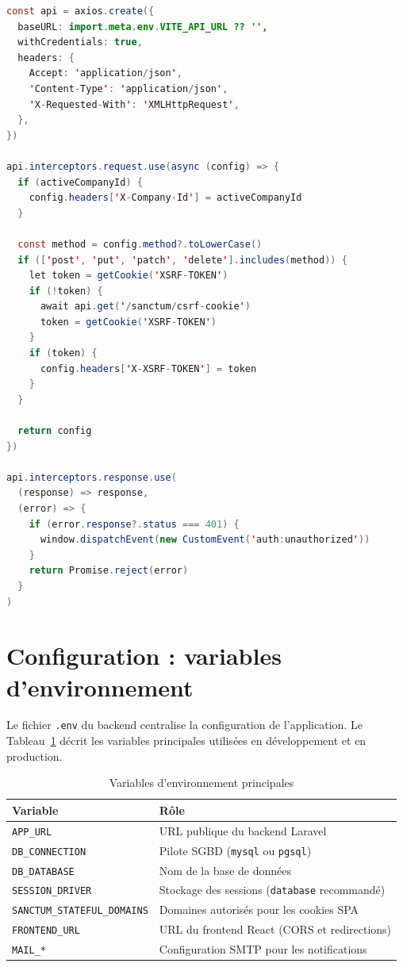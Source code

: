 \begin{lstlisting}[language=Java,
  caption={client.js : configuration Axios et intercepteurs (extrait)}]
const api = axios.create({
  baseURL: import.meta.env.VITE_API_URL ?? '',
  withCredentials: true,
  headers: {
    Accept: 'application/json',
    'Content-Type': 'application/json',
    'X-Requested-With': 'XMLHttpRequest',
  },
})

api.interceptors.request.use(async (config) => {
  if (activeCompanyId) {
    config.headers['X-Company-Id'] = activeCompanyId
  }

  const method = config.method?.toLowerCase()
  if (['post', 'put', 'patch', 'delete'].includes(method)) {
    let token = getCookie('XSRF-TOKEN')
    if (!token) {
      await api.get('/sanctum/csrf-cookie')
      token = getCookie('XSRF-TOKEN')
    }
    if (token) {
      config.headers['X-XSRF-TOKEN'] = token
    }
  }

  return config
})

api.interceptors.response.use(
  (response) => response,
  (error) => {
    if (error.response?.status === 401) {
      window.dispatchEvent(new CustomEvent('auth:unauthorized'))
    }
    return Promise.reject(error)
  }
)
\end{lstlisting}

\section{Configuration : variables d'environnement}

Le fichier \texttt{.env} du backend centralise la configuration de l'application.
Le Tableau~\ref{tab:annexe_env} décrit les variables principales utilisées en
développement et en production.

\begin{table}[H]
\caption{Variables d'environnement principales}
\label{tab:annexe_env}
\centering
\small
\begin{tabular}{|l|p{8.5cm}|}
\hline
\textbf{Variable} & \textbf{Rôle} \\
\hline
\texttt{APP\_URL} & URL publique du backend Laravel \\
\hline
\texttt{DB\_CONNECTION} & Pilote SGBD (\texttt{mysql} ou \texttt{pgsql}) \\
\hline
\texttt{DB\_DATABASE} & Nom de la base de données \\
\hline
\texttt{SESSION\_DRIVER} & Stockage des sessions (\texttt{database} recommandé) \\
\hline
\texttt{SANCTUM\_STATEFUL\_DOMAINS} & Domaines autorisés pour les cookies SPA \\
\hline
\texttt{FRONTEND\_URL} & URL du frontend React (CORS et redirections) \\
\hline
\texttt{MAIL\_*} & Configuration SMTP pour les notifications \\
\hline
\end{tabular}
\end{table}


